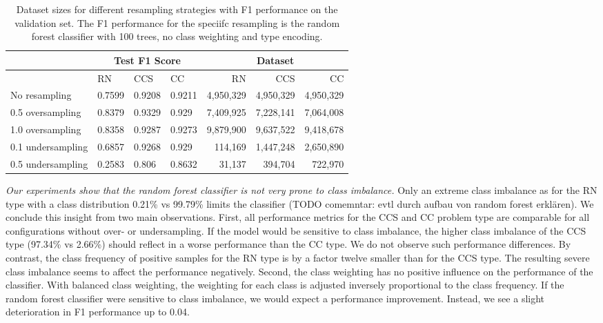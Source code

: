 \begin{table}[]
\tabcolsep=0.11cm
\begin{tabularx}{\textwidth}{lXXX|rrr}
\toprule
                    & \multicolumn{3}{c}{Test F1 Score} & \multicolumn{3}{c}{Dataset}   \\ \midrule
                    & RN        & CCS        & CC     & RN            & CCS         & CC          \\ \midrule
No resampling     &  0.7599   &  0.9208    &  0.9211  &  4,950,329    & 4,950,329   & 4,950,329   \\
0.5 oversampling  &  0.8379   &  0.9329    &  0.929   &  7,409,925    & 7,228,141   & 7,064,008   \\
1.0 oversampling  &  0.8358   &  0.9287    &  0.9273  &  9,879,900    & 9,637,522   & 9,418,678   \\ \midrule
0.1 undersampling &  0.6857   &  0.9268    &  0.929   &  114,169      & 1,447,248   & 2,650,890   \\
0.5 undersampling &  0.2583   &  0.806     &  0.8632  &  31,137       & 394,704     & 722,970     \\ \bottomrule
\end{tabularx}
\caption[Dataset sizes for different resampling strategies and performance for random forest classifier]{Dataset sizes for different resampling strategies with F1 performance on the validation set. The F1 performance for the speciifc resampling is the random forest classifier with 100 trees, no class weighting and type encoding.}
\label{tab:resampling_size_performance_rf}
\end{table}

\textit{Our experiments show that the random forest classifier is not very prone to class imbalance.} Only an extreme class imbalance as for the RN type with a class distribution 0.21\% vs 99.79\% limits the classifier (TODO comemntar: evtl durch aufbau von random forest erklären). We conclude this insight from two main observations. 
First, all performance metrics for the CCS and CC problem type are comparable for all configurations without over- or undersampling. If the model would be sensitive to class imbalance, the higher class imbalance of the CCS type (97.34\% vs 2.66\%) should reflect in a worse performance than the CC type. We do not observe such performance differences. By contrast, the class frequency of positive samples for the RN type is by a factor twelve smaller than for the CCS type. The resulting severe class imbalance seems to affect the performance negatively. 
Second, the class weighting has no positive influence on the performance of the classifier. With balanced class weighting, the weighting for each class is adjusted inversely proportional to the class frequency. If the random forest classifier were sensitive to class imbalance, we would expect a performance improvement. Instead, we see a slight deterioration in F1 performance up to 0.04.


